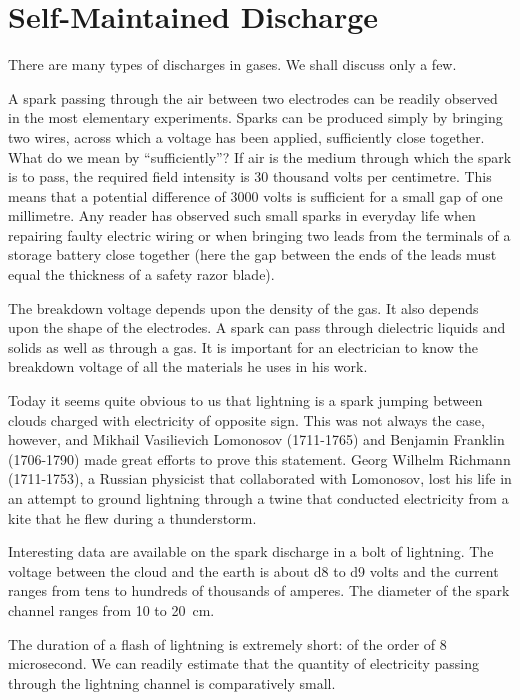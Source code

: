 \section{Self-Maintained Discharge}

There are many types of discharges in gases. We shall discuss only a few.

\noindent{} A spark passing through the air between two electrodes can be readily observed in the most elementary experiments. Sparks can be produced simply by bringing two wires, across which a voltage has been applied, sufficiently close together. What do we mean by ``sufficiently''? If air is the medium through which the spark is to pass, the required field intensity is 30 thousand volts per centimetre. This means that a potential difference of 3000 volts is sufficient for a small gap of one millimetre. Any reader has observed such small sparks in everyday life when repairing faulty electric wiring or when bringing two leads from the terminals of a storage battery close together (here the gap between the ends of the leads must equal the thickness of a safety razor blade).

The breakdown voltage depends upon the density of the gas. It also depends upon the shape of the electrodes. A spark can pass through dielectric liquids and solids as well as through a gas. It is important for an electrician to know the breakdown voltage of all the materials he uses in his work.

Today it seems quite obvious to us that lightning is a spark jumping between clouds charged with electricity of opposite sign. This was not always the case, however, and Mikhail Vasilievich Lomonosov (1711-1765) and Benjamin Franklin (1706-1790) made great efforts to prove this statement. Georg Wilhelm Richmann (1711-1753), a Russian physicist that collaborated with Lomonosov, lost his life in an attempt to ground lightning through a twine that conducted electricity from a kite that he flew during a thunderstorm.

Interesting data are available on the spark discharge in a bolt of lightning. The voltage between the cloud and the earth is about \num{d8} to \num{d9} volts and the current ranges from tens to hundreds of thousands of amperes. The diameter of the spark channel ranges from 10 to \SI{20}{\centi\meter}.

The duration of a flash of lightning is extremely short: of the order of 8 microsecond. We can readily estimate that the quantity of electricity passing through the lightning channel is comparatively small.


